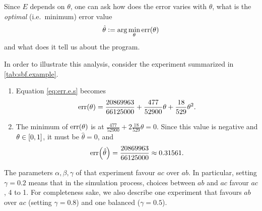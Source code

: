 \documentclass{article}
\newcommand{\at}[1]{\ensuremath{\!\del{#1}}}
\newcommand{\err}[1]{\ensuremath{\mathrm{err}\at{#1}}}
\begin{document}
Since $E$ depends on $\theta$, one can ask how does the error varies
with $\theta$, what is the \emph{optimal} (i.e.\ minimum) error value
\begin{equation}
	\hat{\theta} := \arg\min_\theta \err{\theta}\label{eq:opt.err}
\end{equation}
and what does it tell us about the program.

In order to illustrate this analysis, consider the experiment
summarized in \cref{tab:sbf.example}.

\begin{enumerate}
\item Equation \eqref{eq:err.e.s} becomes
  $$
  \err{\theta} = \frac{20869963}{66125000} + \frac{477}{52900}\theta + \frac{18}{529}\theta^2.
  $$
\item The minimum of $\err{\theta}$ is at
  $\frac{477}{52900} + 2\frac{18}{529}\theta = 0$.  Since this value
  is negative and $\theta \in \intcc{0,1}$, it must be
  $\hat{\theta} = 0$, and
  $$
  \err{\hat{\theta}} = \frac{20869963}{66125000} \approx 0.31561.
  $$
\end{enumerate}

The parameters $\alpha, \beta, \gamma$ of that experiment favour $ac$
over $ab$.  In particular, setting $\gamma = 0.2$ means that in the
simulation process, choices between $ab$ and $ac$ favour $ac$, 4 to 1.
For completeness sake, we also describe one experiment that favours
$ab$ over $ac$ (setting $\gamma=0.8$) and one balanced ($\gamma=0.5$).
\end{document}
